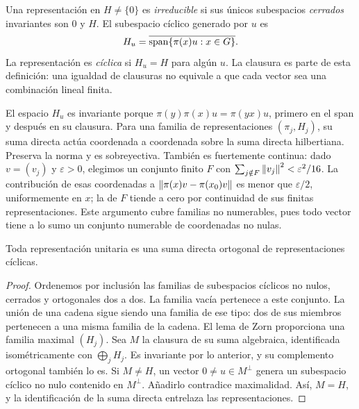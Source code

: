 \begin{definicion}
Una representación en $H\ne\{0\}$ es \emph{irreducible} si sus únicos subespacios \emph{cerrados} invariantes son $0$ y $H$. El subespacio cíclico generado por $u$ es
\[
H_u=\overline{\operatorname{span}\{\pi(x)u:x\in G\}}.
\]
La representación es \emph{cíclica} si $H_u=H$ para algún $u$. La clausura es parte de esta definición: una igualdad de clausuras no equivale a que cada vector sea una combinación lineal finita.
\end{definicion}
El espacio $H_u$ es invariante porque $\pi(y)\pi(x)u=\pi(yx)u$, primero en el span y después en su clausura. Para una familia de representaciones $(\pi_j,H_j)$, su suma directa actúa coordenada a coordenada sobre la suma directa hilbertiana. Preserva la norma y es sobreyectiva. También es fuertemente continua: dado $v=(v_j)$ y $\varepsilon>0$, elegimos un conjunto finito $F$ con $\sum_{j\notin F}\left\lVert v_j\right\rVert^2<\varepsilon^2/16$. La contribución de esas coordenadas a $\left\lVert\pi(x)v-\pi(x_0)v\right\rVert$ es menor que $\varepsilon/2$, uniformemente en $x$; la de $F$ tiende a cero por continuidad de sus finitas representaciones. Este argumento cubre familias no numerables, pues todo vector tiene a lo sumo un conjunto numerable de coordenadas no nulas.

\begin{teorema}\label{v4:rep-ciclicas}
Toda representación unitaria es una suma directa ortogonal de representaciones cíclicas.
\end{teorema}
\begin{proof}
Ordenemos por inclusión las familias de subespacios cíclicos no nulos, cerrados y ortogonales dos a dos. La familia vacía pertenece a este conjunto. La unión de una cadena sigue siendo una familia de ese tipo: dos de sus miembros pertenecen a una misma familia de la cadena. El lema de Zorn proporciona una familia maximal $(H_j)$. Sea $M$ la clausura de su suma algebraica, identificada isométricamente con $\bigoplus_jH_j$. Es invariante por lo anterior, y su complemento ortogonal también lo es. Si $M\ne H$, un vector $0\ne u\in M^\perp$ genera un subespacio cíclico no nulo contenido en $M^\perp$. Añadirlo contradice maximalidad. Así, $M=H$, y la identificación de la suma directa entrelaza las representaciones.
\end{proof}

